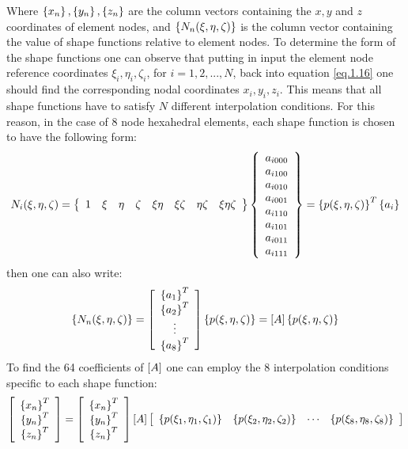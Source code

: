 Where  $\left\lbrace{x_n}\right \rbrace,\left\lbrace{y_n}\right \rbrace,\left\lbrace{z_n}\right \rbrace$ are the column vectors containing the $x,y$ and $z$ coordinates of element nodes, and  $\left\lbrace{N_n(\xi,\eta,\zeta)}\right \rbrace$ is the column vector containing the value of shape functions relative to element nodes. 
To determine the form of the shape functions one can observe that putting in input the element node reference coordinates $\xi_i,\eta_i,\zeta_i$, for $i=1,2,...,N$, back  into equation \ref{eq.1.16} one should find the corresponding nodal coordinates $x_i,y_i,z_i$. This means that all shape functions have to satisfy $N$ different interpolation conditions. For this reason, in the case of 8 node hexahedral elements, each shape function is chosen to have the following form:
\begin{equation}
N_i(\xi,\eta,\zeta)=\left\lbrace{\begin{array}{cccccccc}
1&\xi&\eta&\zeta&\xi\eta&\xi\zeta&\eta\zeta&\xi\eta\zeta
\end{array}}\right \rbrace\left\lbrace{\begin{array}{c}
a_{i000}\\a_{i100}\\a_{i010}\\a_{i001}\\a_{i110}\\a_{i101}\\a_{i011}\\a_{i111}
\end{array}}\right \rbrace=\left\lbrace{p(\xi,\eta,\zeta)}\right \rbrace^T\left\lbrace{a_i}\right \rbrace
\end{equation}
then one can also write:
\begin{equation}
\left\lbrace{N_n(\xi,\eta,\zeta)}\right \rbrace=\left[{\begin{array}{c}
\left\lbrace{a_1}\right \rbrace^T\\
\left\lbrace{a_2}\right \rbrace^T\\
\vdots\\
\left\lbrace{a_8}\right \rbrace^T
\end{array}}\right]\left\lbrace{p(\xi,\eta,\zeta)}\right \rbrace=\left[{A}\right]\left\lbrace{p(\xi,\eta,\zeta)}\right \rbrace
\end{equation}
To find the 64 coefficients of $\left[{A}\right]$ one can employ the 8 interpolation conditions specific to each shape function:
\begin{equation}
\label{eq1.19}
\left[{\begin{array}{c}\left\lbrace{x_n}\right \rbrace^T\\\left\lbrace{y_n}\right \rbrace^T\\\left\lbrace{z_n}\right \rbrace^T\end{array}}\right]=\left[{\begin{array}{c}\left\lbrace{x_n}\right \rbrace^T\\\left\lbrace{y_n}\right \rbrace^T\\\left\lbrace{z_n}\right \rbrace^T\end{array}}\right]\left[{A}\right]\left[{\begin{array}{cccc}
\left\lbrace{p(\xi_1,\eta_1,\zeta_1)}\right \rbrace&\left\lbrace{p(\xi_2,\eta_2,\zeta_2)}\right \rbrace&\cdots&\left\lbrace{p(\xi_8,\eta_8,\zeta_8)}\right \rbrace
\end{array}}\right]
\end{equation}
